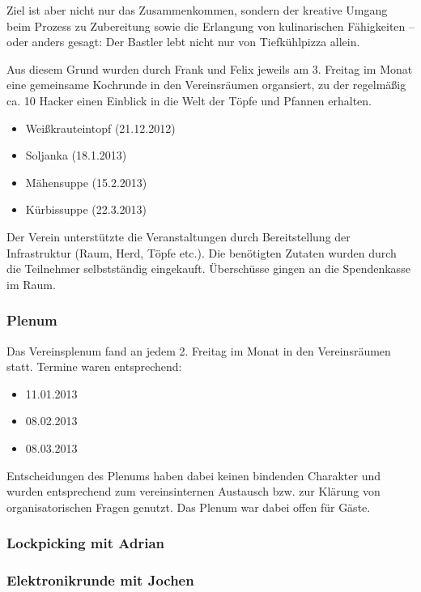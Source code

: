 \documentclass[10pt,DIV16]{scrartcl}
\begin{document}
Ziel ist aber nicht nur das Zusammenkommen, sondern der kreative
Umgang beim Prozess zu Zubereitung sowie die Erlangung von
kulinarischen Fähigkeiten -- oder anders gesagt: Der Bastler lebt
nicht nur von Tiefkühlpizza allein.

Aus diesem Grund wurden durch Frank und Felix jeweils am 3. Freitag
im Monat eine gemeinsame Kochrunde in den Vereinsräumen organsiert,
zu der regelmäßig ca. 10 Hacker einen Einblick in die Welt der Töpfe
und Pfannen erhalten.

\begin{itemize}
	\item Weißkrauteintopf (21.12.2012)
	\item Soljanka (18.1.2013)
	\item Mähensuppe (15.2.2013)
	\item Kürbissuppe (22.3.2013)
\end{itemize}

Der Verein unterstützte die Veranstaltungen durch Bereitstellung der
Infrastruktur (Raum, Herd, Töpfe etc.). Die benötigten Zutaten
wurden durch die Teilnehmer selbstständig eingekauft. Überschüsse
gingen an die Spendenkasse im Raum.

\subsubsection{Plenum}

Das Vereinsplenum fand an jedem 2. Freitag im Monat in den
Vereinsräumen statt. Termine waren entsprechend:

\begin{itemize}
	\item 11.01.2013
	\item 08.02.2013
	\item 08.03.2013
\end{itemize}

Entscheidungen des Plenums haben dabei keinen bindenden Charakter
und wurden entsprechend zum vereinsinternen Austausch bzw. zur
Klärung von organisatorischen Fragen genutzt. Das Plenum war dabei
offen für Gäste.

\subsubsection{Lockpicking mit Adrian}

\subsubsection{Elektronikrunde mit Jochen}
\end{document}
